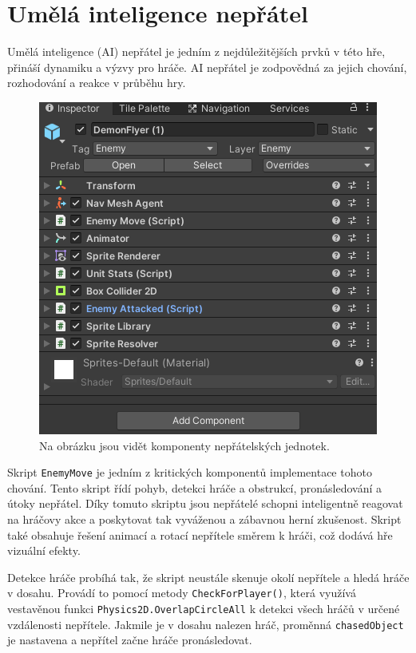 \section{Umělá inteligence nepřátel}
Umělá inteligence (AI) nepřátel je jedním z nejdůležitějších prvků v této hře, přináší dynamiku a výzvy pro hráče. AI nepřátel je zodpovědná za jejich chování, rozhodování a reakce v průběhu hry. 

\begin{figure}[H]
	\centering
	\includegraphics[scale=1]{obrazky-figures/EnemyComponents.png}
	\caption{Na obrázku jsou vidět komponenty nepřátelských jednotek.}
	\label{EnemyScripts}
\end{figure}

Skript \texttt{EnemyMove} je jedním z kritických komponentů implementace tohoto chování. Tento skript řídí pohyb, detekci hráče a obstrukcí, pronásledování a útoky nepřátel. Díky tomuto skriptu jsou nepřátelé schopni inteligentně reagovat na hráčovy akce a poskytovat tak vyváženou a zábavnou herní zkušenost. Skript také obsahuje řešení animací a rotací nepřítele směrem k hráči, což dodává hře vizuální efekty.

Detekce hráče probíhá tak, že skript neustále skenuje okolí nepřítele a hledá hráče v dosahu. Provádí to pomocí metody \texttt{CheckForPlayer()}, která využívá vestavěnou funkci \texttt{Physics2D.OverlapCircleAll} k detekci všech hráčů v určené vzdálenosti nepřítele. Jakmile je v dosahu nalezen hráč, proměnná \texttt{chasedObject} je nastavena a nepřítel začne hráče pronásledovat.

